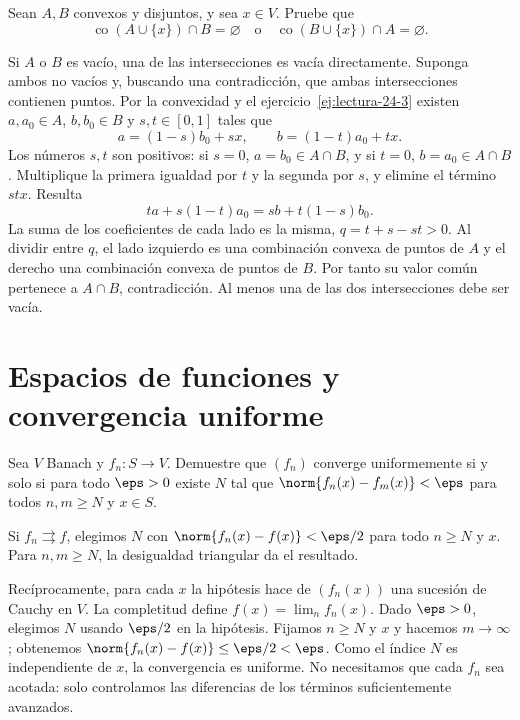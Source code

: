 \begin{ejercicio}\label{ej:lectura-24-7}
Sean $A,B$ convexos y disjuntos, y sea $x\in V$. Pruebe que
\[
 \operatorname{co}(A\cup\{x\})\cap B=\varnothing
 \quad\text{o}\quad
 \operatorname{co}(B\cup\{x\})\cap A=\varnothing.
\]
\end{ejercicio}
\begin{solucion}
Si $A$ o $B$ es vacío, una de las intersecciones es vacía directamente. Suponga ambos no vacíos y, buscando una contradicción, que ambas intersecciones contienen puntos. Por la convexidad y el ejercicio~\ref{ej:lectura-24-3} existen $a,a_0\in A$, $b,b_0\in B$ y $s,t\in[0,1]$ tales que
\[
 a=(1-s)b_0+sx,\qquad b=(1-t)a_0+tx.
\]
Los números $s,t$ son positivos: si $s=0$, $a=b_0\in A\cap B$, y si $t=0$, $b=a_0\in A\cap B$. Multiplique la primera igualdad por $t$ y la segunda por $s$, y elimine el término $stx$. Resulta
\[
 ta+s(1-t)a_0=sb+t(1-s)b_0.
\]
La suma de los coeficientes de cada lado es la misma, $q=t+s-st>0$.
Al dividir entre $q$, el lado izquierdo es una combinación convexa de puntos de $A$ y el derecho una combinación convexa de puntos de $B$. Por tanto su valor común pertenece a $A\cap B$, contradicción. Al menos una de las dos intersecciones debe ser vacía.
\end{solucion}

\chapter{Espacios de funciones y convergencia uniforme}

\begin{ejercicio}\label{ej:lectura-26-1}\label{ch26:ej1}
Sea $V$ Banach y $f_n:S\to V$. Demuestre que $(f_n)$ converge uniformemente si y solo si para todo $\eps>0$ existe $N$ tal que $\norm{f_n(x)-f_m(x)}<\eps$ para todos $n,m\ge N$ y $x\in S$.
\end{ejercicio}
\begin{solucion}
Si $f_n\rightrightarrows f$, elegimos $N$ con $\norm{f_n(x)-f(x)}<\eps/2$ para todo $n\ge N$ y $x$. Para $n,m\ge N$, la desigualdad triangular da el resultado.

Recíprocamente, para cada $x$ la hipótesis hace de $(f_n(x))$ una sucesión de Cauchy en $V$. La completitud define $f(x)=\lim_nf_n(x)$. Dado $\eps>0$, elegimos $N$ usando $\eps/2$ en la hipótesis. Fijamos $n\ge N$ y $x$ y hacemos $m\to\infty$; obtenemos $\norm{f_n(x)-f(x)}\le\eps/2<\eps$. Como el índice $N$ es independiente de $x$, la convergencia es uniforme. No necesitamos que cada $f_n$ sea acotada: solo controlamos las diferencias de los términos suficientemente avanzados.
\end{solucion}

